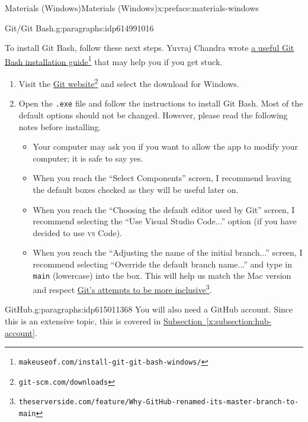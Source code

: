 \documentclass[oneside,10pt,]{book}
\newcommand{\xreffont}{\relax}
\newcommand{\mono}[1]{\texttt{#1}}
\newcommand{\initialism}[1]{\textsc{\MakeLowercase{#1}}}
\begin{document}
\begin{preface}{Materials (Windows)}{}{Materials (Windows)}{}{}{x:preface:materials-windows}
\begin{paragraphs}{Git\slash{}Git Bash.}{g:paragraphs:idp614991016}
\par
To install Git Bash, follow these next steps. Yuvraj Chandra wrote \href{https://www.makeuseof.com/install-git-git-bash-windows/}{a useful Git Bash installation guide}\footnote{\nolinkurl{makeuseof.com/install-git-git-bash-windows/}\label{g:fn:idp614997416}} that may help you if you get stuck.%
\begin{enumerate}
\item{}Visit the \href{https://git-scm.com/downloads}{Git website}\footnote{\nolinkurl{git-scm.com/downloads}\label{g:fn:idp614999976}} and select the download for Windows.%
\item{}Open the \mono{.exe} file and follow the instructions to install Git Bash. Most of the default options should not be changed. However, please read the following notes before installing.%
\begin{itemize}[label=\textbullet]
\item{}Your computer may ask you if you want to allow the app to modify your computer; it is safe to say yes.%
\item{}When you reach the ``Select Components'' screen, I recommend leaving the default boxes checked as they will be useful later on.%
\item{}When you reach the ``Choosing the default editor used by Git'' screen, I recommend selecting the ``Use Visual Studio Code...'' option (if you have decided to use \initialism{VS} Code).%
\item{}When you reach the ``Adjusting the name of the initial branch...'' screen, I recommend selecting ``Override the default branch name...'' and type in \mono{main} (lowercase) into the box. This will help us match the Mac version and respect \href{}{Git's attempts to be more inclusive}\footnote{\nolinkurl{theserverside.com/feature/Why-GitHub-renamed-its-master-branch-to-main}\label{g:fn:idp615003944}}.%
\end{itemize}
%
\end{enumerate}
%
\end{paragraphs}%
\begin{paragraphs}{GitHub.}{g:paragraphs:idp615011368}%
You will also need a GitHub account. Since this is an extensive topic, this is covered in \hyperref[x:subsection:hub-account]{Subsection~{\xreffont\ref{x:subsection:hub-account}}}.%
\end{paragraphs}%
\end{preface}
%
%
\typeout{************************************************}
\typeout{************************************************}
\end{document}
